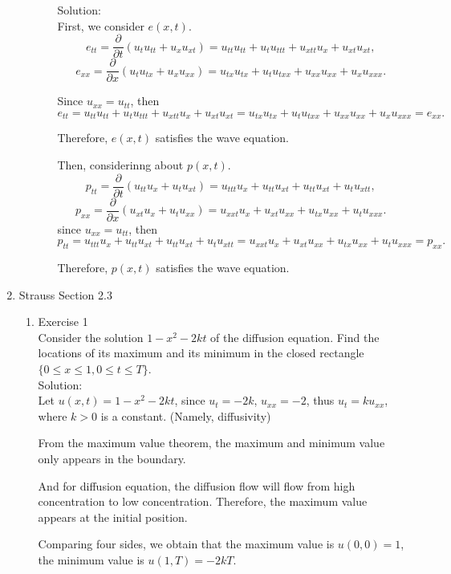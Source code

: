 \documentclass[12pt]{article}%
\begin{document}
\begin{enumerate}
\begin{enumerate}
\begin{enumerate}
            Solution:\\
             First, we consider $e(x,t).$
            \[e_{tt}  =\frac{\partial}{\partial t}\left(u_{t} u_{tt}+u_{x} u_{xt}\right)=u_{tt} u_{tt}+u_{t} u_{ttt}+u_{xtt} u_{x}+u_{xt} u_{xt},\]          
            \[ e_{xx}  =\frac{\partial}{\partial x}\left(u_{t} u_{tx}+u_{x} u_{xx}\right) =u_{tx} u_{tx}+u_{t} u_{txx}+u_{xx} u_{xx}+u_{x} u_{xxx}. \]
            
            Since $u_{xx}=u_{tt}$, then 
            \[ e_{tt}=u_{tt} u_{tt}+u_{t} u_{ttt}+u_{xtt} u_{x}+u_{xt} u_{xt}=u_{tx} u_{tx}+u_{t} u_{txx}+u_{xx} u_{xx}+u_{x} u_{xxx}=e_{xx}. \]
            
            Therefore, $e(x,t)$ satisfies the wave equation.
            
 
            Then, considerinng about $p(x,t).$
            \[p_{tt}  =\frac{\partial}{\partial t}\left(u_{tt} u_{x}+u_{t} u_{xt}\right)=u_{ttt} u_{x}+u_{tt} u_{xt}+u_{tt} u_{xt}+u_{t} u_{xtt},\]          
            \[ p_{xx}  =\frac{\partial}{\partial x}\left(u_{xt} u_{x}+u_{t} u_{xx}\right) =u_{xxt} u_{x}+u_{xt} u_{xx}+u_{tx} u_{xx}+u_{t} u_{xxx}. \]
            since $u_{xx}=u_{tt}$, then 
            \[ p_{tt}=u_{ttt} u_{x}+u_{tt} u_{xt}+u_{tt} u_{xt}+u_{t} u_{xtt}=u_{xxt} u_{x}+u_{xt} u_{xx}+u_{tx} u_{xx}+u_{t} u_{xxx}=p_{xx}. \]
            
            Therefore, $p(x,t)$ satisfies the wave equation.
        \end{enumerate}
    \end{enumerate}
    
    \pagebreak

    \item Strauss Section 2.3 \smallskip
    \begin{enumerate}
        \item Exercise 1 \smallskip \\
        Consider the solution $1 - x^2 -2kt$ of the diffusion equation.  Find the locations of its maximum and its minimum in the closed rectangle $\{0 \leq x \leq 1, 0 \leq t \leq T\}$. \smallskip \\
          Solution:\\
          Let $u(x,t)=1 - x^2 -2kt$, since $u_{t}=-2k$, $u_{xx}=-2$, thus $u_{t}=ku_{xx}$, where $k>0$ is a constant. (Namely, diffusivity)
         
          From the maximum value theorem, the maximum and minimum value only appears in the boundary.
          
          And for diffusion equation, the diffusion flow will flow from high concentration to low concentration. Therefore, the maximum value appears at the initial position. 
          
          Comparing four sides, we obtain that 
          the maximum value is $u(0,0)=1$, the minimum value is $u(1,T)=-2kT$.
        
    \end{enumerate}
\end{enumerate}
\end{document}
